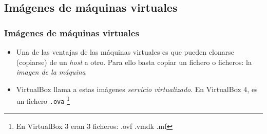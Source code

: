 \documentclass[ucs]{beamer}
\begin{document}

\subsection{Imágenes de máquinas virtuales}
\begin{frame}[fragile]
\frametitle{Imágenes de máquinas virtuales}
\begin{itemize}
\item
Una de las ventajas de las máquinas virtuales es que pueden
clonarse (copiarse) de un 
\emph{host}
a otro. Para ello basta copiar un fichero o ficheros: la \emph{imagen de la máquina}

\item
VirtualBox llama a estas imágenes \emph{servicio virtualizado}.
En VirtualBox 4, es un fichero \verb|.ova| 
\footnote{En VirtualBox 3 eran 3 ficheros: .ovf .vmdk .mf}
\end{itemize}
%

\end{frame}
\end{document}

